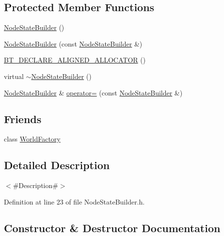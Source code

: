 \subsection*{Protected Member Functions}
\begin{DoxyCompactItemize}
\item 
\mbox{\hyperlink{classnjli_1_1_node_state_builder_a7e43b6eebf0448e71cae5a4112d15082}{Node\+State\+Builder}} ()
\item 
\mbox{\hyperlink{classnjli_1_1_node_state_builder_aa5bb9e667cc9f77e4c947ae1bede3c18}{Node\+State\+Builder}} (const \mbox{\hyperlink{classnjli_1_1_node_state_builder}{Node\+State\+Builder}} \&)
\item 
\mbox{\hyperlink{classnjli_1_1_node_state_builder_ad972d6a38875b7ad117fdd38d38c80d4}{B\+T\+\_\+\+D\+E\+C\+L\+A\+R\+E\+\_\+\+A\+L\+I\+G\+N\+E\+D\+\_\+\+A\+L\+L\+O\+C\+A\+T\+OR}} ()
\item 
virtual \mbox{\hyperlink{classnjli_1_1_node_state_builder_a1e49ab9edf8416fc7c94dd020fbb6f87}{$\sim$\+Node\+State\+Builder}} ()
\item 
\mbox{\hyperlink{classnjli_1_1_node_state_builder}{Node\+State\+Builder}} \& \mbox{\hyperlink{classnjli_1_1_node_state_builder_a2b7f47d5c47ffc145aa7cb924f322298}{operator=}} (const \mbox{\hyperlink{classnjli_1_1_node_state_builder}{Node\+State\+Builder}} \&)
\end{DoxyCompactItemize}
\subsection*{Friends}
\begin{DoxyCompactItemize}
\item 
class \mbox{\hyperlink{classnjli_1_1_node_state_builder_acb96ebb09abe8f2a37a915a842babfac}{World\+Factory}}
\end{DoxyCompactItemize}


\subsection{Detailed Description}
$<$\#\+Description\#$>$ 

Definition at line 23 of file Node\+State\+Builder.\+h.



\subsection{Constructor \& Destructor Documentation}
\mbox{\label{classnjli_1_1_node_state_builder_a7e43b6eebf0448e71cae5a4112d15082}} 
